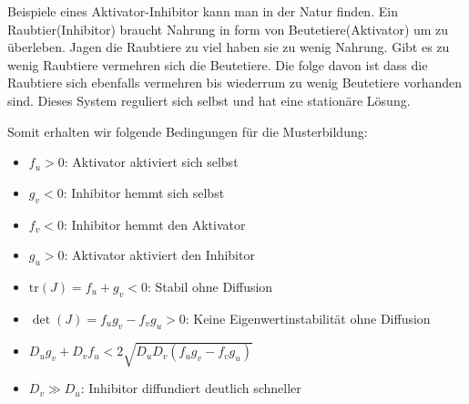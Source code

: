 Beispiele eines Aktivator-Inhibitor kann man in der Natur finden.
Ein Raubtier(Inhibitor) braucht Nahrung in form von Beutetiere(Aktivator) um zu überleben.
Jagen die Raubtiere zu viel haben sie zu wenig Nahrung.
Gibt es zu wenig Raubtiere vermehren sich die Beutetiere.
Die folge davon ist dass die Raubtiere sich ebenfalls vermehren bis wiederrum zu wenig Beutetiere vorhanden sind.
Dieses System reguliert sich selbst und hat eine stationäre Lösung.

Somit erhalten wir folgende Bedingungen für die Musterbildung:
        \begin{itemize}
            \item \(f_u > 0\): Aktivator aktiviert sich selbst
            \item \(g_v < 0\): Inhibitor hemmt sich selbst
            \item \(f_v < 0\): Inhibitor hemmt den Aktivator
            \item \(g_u > 0\): Aktivator aktiviert den Inhibitor
            \item \(\text{tr}(J) = f_u + g_v < 0\): Stabil ohne Diffusion
            \item \(\det(J) = f_u g_v - f_v g_u > 0\): Keine Eigenwertinstabilität ohne Diffusion
            \item \(D_u g_v + D_v f_u < 2\sqrt{D_u D_v (f_u g_v - f_v g_u)}\)
            \item \(D_v \gg D_u\): Inhibitor diffundiert deutlich schneller
        \end{itemize}



